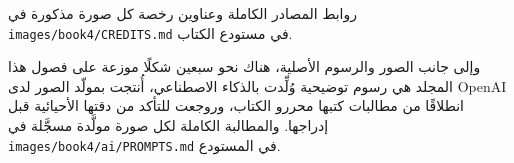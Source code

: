 روابط المصادر الكاملة وعناوين رخصة كل صورة مذكورة في
\texttt{images/\allowbreak book4/\allowbreak CREDITS.md} في مستودع الكتاب.

\bigskip
وإلى جانب الصور والرسوم الأصلية، هناك نحو سبعين شكلًا موزعة على فصول
هذا المجلد هي رسوم توضيحية وُلِّدت بالذكاء الاصطناعي، أُنتجت بمولّد الصور
لدى OpenAI انطلاقًا من مطالبات كتبها محررو الكتاب، وروجعت للتأكد من
دقتها الأحيائية قبل إدراجها. والمطالبة الكاملة لكل صورة مولَّدة مسجَّلة في
\texttt{images/\allowbreak book4/\allowbreak ai/\allowbreak PROMPTS.md} في المستودع.
\par\endgroup
\clearpage
